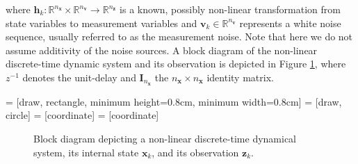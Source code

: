 \noindent
where $\bm{h}_k: \mathbb{R}^{n_{\bm{x}}} \times \mathbb{R}^{n_{\bm{v}}} \rightarrow \mathbb{R}^{n_{\bm{z}}}$ is a known, possibly non-linear transformation from state variables to measurement variables and $\bm{v}_{k} \in \mathbb{R}^{n_{\bm{v}}}$ represents a white noise sequence, usually referred to as the measurement noise. Note that here we do not assume additivity of the noise sources. A block diagram of the non-linear discrete-time dynamic system and its observation is depicted in Figure \ref{fig:non-linear-dynamic-system}, where $z^{-1}$ denotes the unit-delay and $\bm{I}_{n_{\bm{x}}}$ the $n_{\bm{x}}\times n_{\bm{x}}$ identity matrix.

 = [draw, rectangle, minimum height=0.8cm, minimum width=0.8cm]
 = [draw, circle]
 = [coordinate]
 = [coordinate]

\begin{figure}[t]
\centering
{}


\caption[Block diagram depicting a non-linear discrete-time dynamical system, its internal state, and its observation.]{Block diagram depicting a non-linear discrete-time dynamical system, its internal state $\bm{x}_{k}$, and its observation $\bm{z}_{k}$.} \label{fig:non-linear-dynamic-system}
\end{figure}

